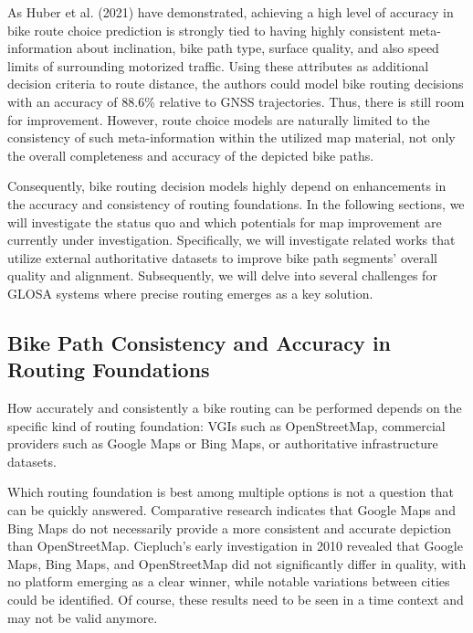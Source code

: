 As Huber et al. (2021) \cite{huber_modelling_2021} have demonstrated, achieving a high level of accuracy in bike route choice prediction is strongly tied to having highly consistent meta-information about inclination, bike path type, surface quality, and also speed limits of surrounding motorized traffic. Using these attributes as additional decision criteria to route distance, the authors could model bike routing decisions with an accuracy of 88.6\% relative to GNSS trajectories. Thus, there is still room for improvement. However, route choice models are naturally limited to the consistency of such meta-information within the utilized map material, not only the overall completeness and accuracy of the depicted bike paths.

Consequently, bike routing decision models highly depend on enhancements in the accuracy and consistency of routing foundations. In the following sections, we will investigate the status quo and which potentials for map improvement are currently under investigation. Specifically, we will investigate related works that utilize external authoritative datasets to improve bike path segments' overall quality and alignment. Subsequently, we will delve into several challenges for GLOSA systems where precise routing emerges as a key solution.

\subsection{Bike Path Consistency and Accuracy in Routing Foundations}

How accurately and consistently a bike routing can be performed depends on the specific kind of routing foundation: VGIs such as OpenStreetMap, commercial providers such as Google Maps or Bing Maps, or authoritative infrastructure datasets.

Which routing foundation is best among multiple options is not a question that can be quickly answered. Comparative research indicates that Google Maps and Bing Maps do not necessarily provide a more consistent and accurate depiction than OpenStreetMap. Ciepluch's early investigation in 2010 \cite{ciepluch_comparison_2010} revealed that Google Maps, Bing Maps, and OpenStreetMap did not significantly differ in quality, with no platform emerging as a clear winner, while notable variations between cities could be identified. Of course, these results need to be seen in a time context and may not be valid anymore. 

